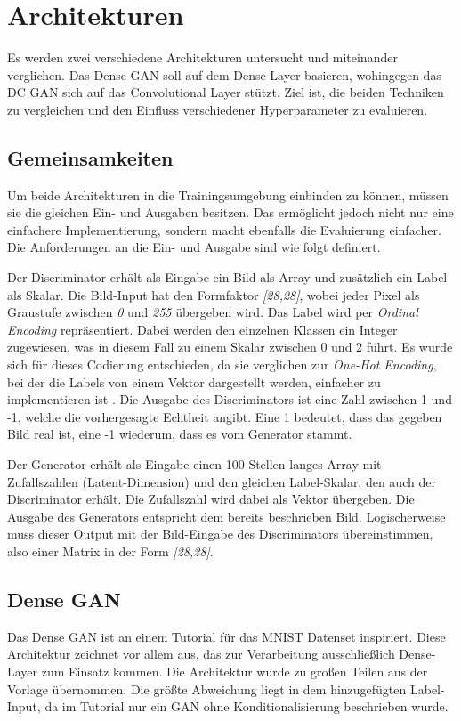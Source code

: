 \section{Architekturen}
Es werden zwei verschiedene Architekturen untersucht und miteinander verglichen.
Das Dense GAN soll auf dem Dense Layer basieren, wohingegen das DC GAN sich auf das Convolutional Layer stützt.
Ziel ist, die beiden Techniken zu vergleichen und den Einfluss verschiedener Hyperparameter zu evaluieren.

\subsection{Gemeinsamkeiten}
Um beide Architekturen in die Trainingsumgebung einbinden zu können, müssen sie die gleichen Ein- und Ausgaben besitzen.
Das ermöglicht jedoch nicht nur eine einfachere Implementierung, sondern macht ebenfalls die Evaluierung einfacher.
Die Anforderungen an die Ein- und Ausgabe sind wie folgt definiert.
\newline

Der Discriminator erhält als Eingabe ein Bild als Array und zusätzlich ein Label als Skalar.
Die Bild-Input hat den Formfaktor \textit{[28,28]}, wobei jeder Pixel als Graustufe zwischen \textit{0} und \textit{255} übergeben wird.
Das Label wird per \textit{Ordinal Encoding} repräsentiert.
Dabei werden den einzelnen Klassen ein Integer zugewiesen, was in diesem Fall zu einem Skalar zwischen 0 und 2 führt.
Es wurde sich für dieses Codierung entschieden, da sie verglichen zur \textit{One-Hot Encoding}, bei der die Labels von einem Vektor dargestellt werden, einfacher zu implementieren ist \cite{label_encoding}.
Die Ausgabe des Discriminators ist eine Zahl zwischen 1 und -1, welche die vorhergesagte Echtheit angibt.
Eine 1 bedeutet, dass das gegeben Bild real ist, eine -1 wiederum, dass es vom Generator stammt.
\newline

Der Generator erhält als Eingabe einen 100 Stellen langes Array mit Zufallszahlen (Latent-Dimension) und den gleichen Label-Skalar, den auch der Discriminator erhält.
Die Zufallszahl wird dabei als Vektor übergeben.
Die Ausgabe des Generators entspricht dem bereits beschrieben Bild.
Logischerweise muss dieser Output mit der Bild-Eingabe des Discriminators übereinstimmen, also einer Matrix in der Form \textit{[28,28]}.

\subsection{Dense GAN}
\label{section:dense-gan}
Das Dense GAN ist an einem Tutorial für das MNIST Datenset inspiriert.
Diese Architektur zeichnet vor allem aus, das zur Verarbeitung ausschließlich Dense-Layer zum Einsatz kommen.
Die Architektur wurde zu großen Teilen aus der Vorlage übernommen.
Die größte Abweichung liegt in dem hinzugefügten Label-Input, da im Tutorial nur ein GAN ohne Konditionalisierung beschrieben wurde.

